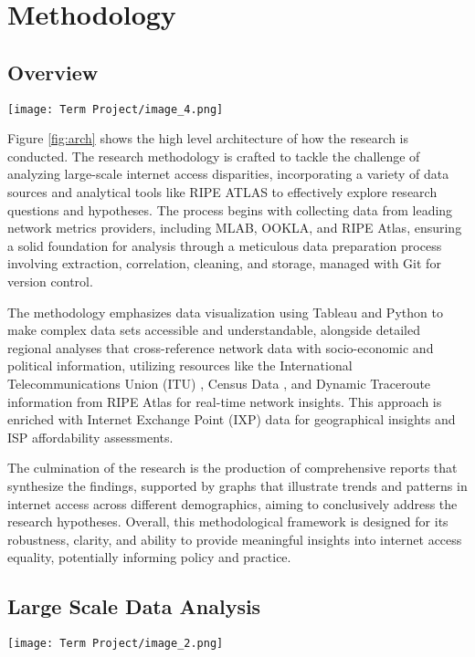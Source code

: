 \documentclass[conference]{IEEEtran}
\begin{document}
\section{Methodology}
\label{sec:methodology}

\subsection{Overview}
\begin{figure*}[!htbp]
    \centering
    \texttt{[image: Term Project/image\_4.png]} %
    \caption{Comprehensive Data Analysis Workflow}
    \label{fig:arch}
\end{figure*}

Figure \ref{fig:arch} shows the high level architecture of how the research is conducted. The research methodology is crafted to tackle the challenge of analyzing large-scale internet access disparities, incorporating a variety of data sources and analytical tools like RIPE ATLAS to effectively explore research questions and hypotheses. The process begins with collecting data from leading network metrics providers, including MLAB, OOKLA, and RIPE Atlas, ensuring a solid foundation for analysis through a meticulous data preparation process involving extraction, correlation, cleaning, and storage, managed with Git for version control.

The methodology emphasizes data visualization using Tableau and Python to make complex data sets accessible and understandable, alongside detailed regional analyses that cross-reference network data with socio-economic and political information, utilizing resources like the International Telecommunications Union (ITU) \cite{13}, Census Data \cite{14} \cite{15}, and Dynamic Traceroute information from RIPE Atlas for real-time network insights. This approach is enriched with Internet Exchange Point (IXP) data for geographical insights and ISP affordability assessments.

The culmination of the research is the production of comprehensive reports that synthesize the findings, supported by graphs that illustrate trends and patterns in internet access across different demographics, aiming to conclusively address the research hypotheses. Overall, this methodological framework is designed for its robustness, clarity, and ability to provide meaningful insights into internet access equality, potentially informing policy and practice.

\subsection{Large Scale Data Analysis}
\begin{figure*}[!htbp]
    \centering
    \texttt{[image: Term Project/image\_2.png]}
    \caption{High Level Bulk Analysis}
    \label{fig:high_level}
\end{figure*}
\end{document}
